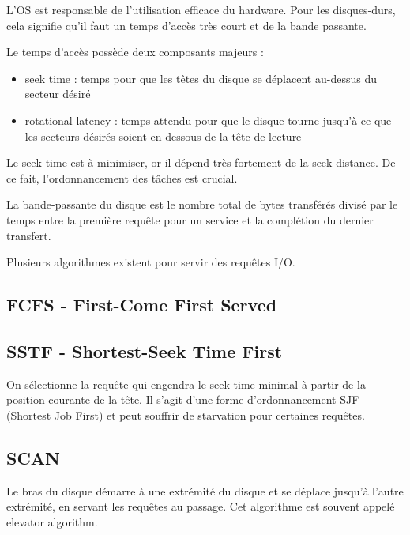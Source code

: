 L'OS est responsable de l'utilisation efficace du hardware. Pour les disques-durs, cela signifie qu'il faut un temps d'accès très court et de la bande passante.

Le temps d'accès possède deux composants majeurs :

\begin{itemize}
	\item seek time : temps pour que les têtes du disque se déplacent au-dessus du secteur désiré
	\item rotational latency : temps attendu pour que le disque tourne jusqu'à ce que les secteurs désirés soient en dessous de la tête de lecture
\end{itemize}

Le seek time est à minimiser, or il dépend très fortement de la seek distance. De ce fait, l'ordonnancement des tâches est crucial.

La bande-passante du disque est le nombre total de bytes transférés divisé par le temps entre la première requête pour un service et la complétion du dernier transfert.

Plusieurs algorithmes existent pour servir des requêtes I/O.

	\subsection{FCFS - First-Come First Served}
	
	
	\subsection{SSTF - Shortest-Seek Time First}
	
	On sélectionne la requête qui engendra le seek time minimal à partir de la position courante de la tête. Il s'agit d'une forme d'ordonnancement SJF (Shortest Job First) et peut souffrir de starvation pour certaines requêtes.
		
	
	\subsection{SCAN}
	
	Le bras du disque démarre à une extrémité du disque et se déplace jusqu'à l'autre extrémité, en servant les requêtes au passage.  Cet algorithme est souvent appelé elevator algorithm.
	
	
